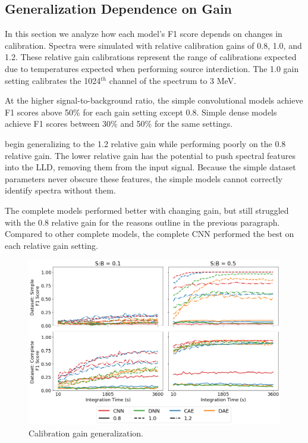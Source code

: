 \subsection{Generalization Dependence on Gain}

In this section we analyze how each model's F1 score depends on changes in calibration. Spectra were simulated with relative calibration gains of 0.8, 1.0, and 1.2. These relative gain calibrations represent the range of calibrations expected due to temperatures expected when performing source interdiction. The 1.0 gain setting calibrates the 1024$^{th}$ channel of the spectrum to 3 MeV.

At the higher signal-to-background ratio, the simple convolutional models achieve F1 scores above 50\% for each gain setting except 0.8. Simple dense models achieve F1 scores between 30\% and 50\% for the same settings.


begin generalizing to the 1.2 relative gain while performing poorly on the 0.8 relative gain. The lower relative gain has the potential to push spectral features into the LLD, removing them from the input signal. Because the simple dataset parameters never obscure these features, the simple models cannot correctly identify spectra without them.

The complete models performed better with changing gain, but still struggled with the 0.8 relative gain for the reasons outline in the previous paragraph. Compared to other complete models, the complete CNN performed the best on each relative gain setting.

\begin{figure}[H]
	\centering
	\includegraphics[width=1.0\linewidth]{images/sim-generalization-cal}
	\caption{Calibration gain generalization.}
	\label{fig:sim-generalization-cal}
\end{figure}




